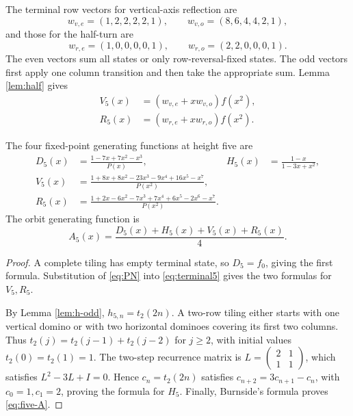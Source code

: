 The terminal row vectors for vertical-axis reflection are
\[
 w_{v,e}=(1,2,2,2,2,1),\qquad
 w_{v,o}=(8,6,4,4,2,1),
\]
and those for the half-turn are
\[
 w_{r,e}=(1,0,0,0,0,1),\qquad
 w_{r,o}=(2,2,0,0,0,1).
\]
The even vectors sum all states or only row-reversal-fixed
states. The odd vectors first apply one column transition
and then take the appropriate sum.
Lemma \ref{lem:half} gives
\begin{equation}\label{eq:terminal5}
\begin{split}
 V_5(x)&=(w_{v,e}+xw_{v,o})f(x^2),\\
 R_5(x)&=(w_{r,e}+xw_{r,o})f(x^2).
\end{split}
\end{equation}

\begin{theorem}\label{thm:five}
The four fixed-point generating functions at height five are
\begin{align}
 D_5(x)&=\frac{1-7x+7x^2-x^3}{P(x)},&
 H_5(x)&=\frac{1-x}{1-3x+x^2},\label{eq:five-DH}\\
 V_5(x)&=\frac{1+8x+8x^2-23x^3-9x^4+16x^5-x^7}{P(x^2)},\label{eq:five-V}\\
 R_5(x)&=\frac{1+2x-6x^2-7x^3+7x^4+6x^5-2x^6-x^7}{P(x^2)}.\label{eq:five-R}
\end{align}
The orbit generating function is
\begin{equation}\label{eq:five-A}
 A_5(x)=\frac{D_5(x)+H_5(x)+V_5(x)+R_5(x)}4.
\end{equation}
\end{theorem}
\begin{proof}
A complete tiling has empty terminal state, so $D_5=f_0$,
giving the first formula.
Substitution of \eqref{eq:PN} into \eqref{eq:terminal5} gives
the two formulas for $V_5,R_5$.

By Lemma \ref{lem:h-odd}, $h_{5,n}=t_2(2n)$.
A two-row tiling either starts with one vertical domino or
with two horizontal dominoes covering its first two columns.
Thus $t_2(j)=t_2(j-1)+t_2(j-2)$ for $j\ge2$, with initial
values $t_2(0)=t_2(1)=1$.
The two-step recurrence matrix is
$L=\left(\begin{smallmatrix}2&1\\1&1\end{smallmatrix}\right)$,
which satisfies $L^2-3L+I=0$.
Hence $c_n=t_2(2n)$ satisfies $c_{n+2}=3c_{n+1}-c_n$,
with $c_0=1,c_1=2$, proving the formula for $H_5$.
Finally, Burnside's formula proves \eqref{eq:five-A}.
\end{proof}

